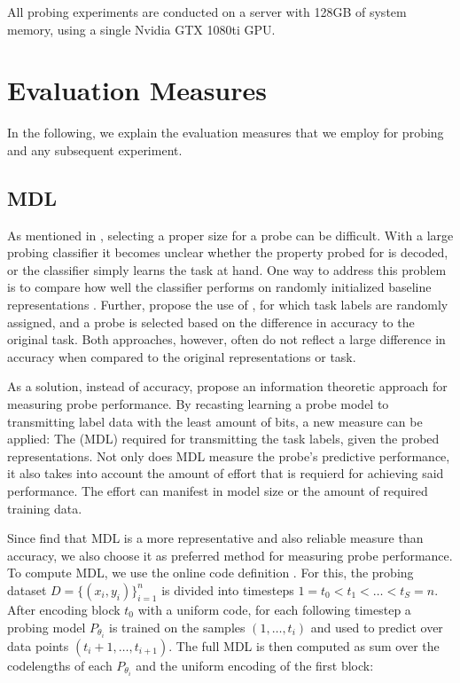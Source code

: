 All probing experiments are conducted on a server with 128GB of system memory, using a single Nvidia GTX 1080ti GPU.

\section{Evaluation Measures}
\label{sec:metrics}
In the following, we explain the evaluation measures that we employ for probing and any subsequent experiment.

\subsection{MDL}
As mentioned in , selecting a proper size for a probe can be difficult. With a large probing classifier it becomes unclear whether the property probed for is decoded, or the classifier simply learns the task at hand. One way to address this problem is to compare how well the classifier performs on randomly initialized baseline representations \cite{zhang-bowman-2018-language}. Further, \cite{DBLP:journals/corr/abs-1909-03368} propose the use of , for which task labels are randomly assigned, and a probe is selected based on the difference in accuracy to the original task. Both approaches, however, often do not reflect a large difference in accuracy when compared to the original representations or task.

As a solution, instead of accuracy, \cite{voita-titov-2020-information} propose an information theoretic approach for measuring probe performance. By recasting learning a probe model to transmitting label data with the least amount of bits, a new measure can be applied: The  (MDL) required for transmitting the task labels, given the probed representations. Not only does MDL measure the probe's predictive performance, it also takes into account the amount of effort that is requierd for achieving said performance. The effort can manifest in model size or the amount of required training data.

Since \cite{voita-titov-2020-information} find that MDL is a more representative and also reliable measure than accuracy, we also choose it as preferred method for measuring probe performance. To compute MDL, we use the online code definition \cite{Rissanen1984UniversalCI}.
For this, the probing dataset $D=\{(x_i, y_i)\}_{i=1}^n$ is divided into timesteps $1=t_0 < t_1 < \ldots < t_S = n$. After encoding block $t_0$ with a uniform code, for each following timestep a probing model $P_{\theta_i}$ is trained on the samples $(1, \ldots, t_i)$ and used to predict over data points $(t_i + 1,\ldots, t_{i + 1})$. The full MDL is then computed as sum over the codelengths of each $P_{\theta_i}$ and the uniform encoding of the first block:

